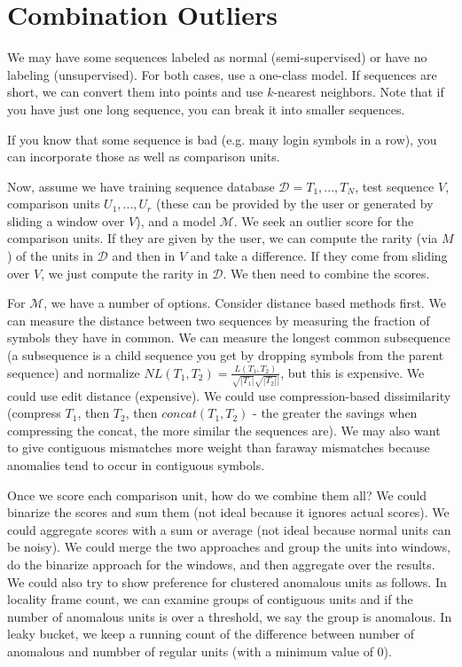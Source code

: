 \documentclass[a4paper]{article}
\begin{document}
\section{Combination Outliers}
We may have some sequences labeled as normal (semi-supervised) or have no
labeling (unsupervised). For both cases, use a one-class model. If sequences are
short, we can convert them into points and use $k$-nearest neighbors. Note that
if you have just one long sequence, you can break it into smaller sequences.

If you know that some sequence is bad (e.g. many login symbols in a row), you
can incorporate those as well as comparison units.

Now, assume we have training sequence database $\mathcal{D} = T_1, ..., T_N$,
test sequence $V$, comparison units $U_1, ..., U_r$ (these can be provided by
the user or generated by sliding a window over $V$), and a model $\mathcal{M}$.
We seek an outlier score for the comparison units. If they are given by the
user, we can compute the rarity (via $M$) of the units in $\mathcal{D}$ and then
in $V$ and take a difference. If they come from sliding over $V$, we just
compute the rarity in $\mathcal{D}$. We then need to combine the scores.

For $\mathcal{M}$, we have a number of options. Consider distance based methods
first. We can measure the distance between two sequences by measuring the
fraction of symbols they have in common. We can measure the longest common
subsequence (a subsequence is a child sequence you get by dropping symbols
from the parent sequence) and normalize $NL(T_1, T_2) = \frac{L(T_1, T_2)}{
\sqrt{|T_1|}\sqrt{|T_2|}]}$, but this is expensive. We could use edit distance
(expensive). We could use compression-based dissimilarity (compress $T_1$,
then $T_2$, then $concat(T_1, T_2)$ - the greater the savings when compressing
the concat, the more similar the sequences are). We may also want to give
contiguous mismatches more weight than faraway mismatches because anomalies
tend to occur in contiguous symbols.

Once we score each comparison unit, how do we combine them all? We could
binarize the scores and sum them (not ideal because it ignores
actual scores). We could aggregate scores with a sum or average (not ideal
because normal units can be noisy). We could merge the two approaches and
group the units into windows, do the binarize approach for the windows, and then
aggregate over the results. We could also try to show preference for clustered
anomalous units as follows. In locality frame count, we can examine groups of
contiguous units and if the number of anomalous units is over a threshold, we
say the group is anomalous. In leaky bucket, we keep a running count of the
difference between number of anomalous and numbber of regular units (with a
minimum value of 0).
\end{document}
